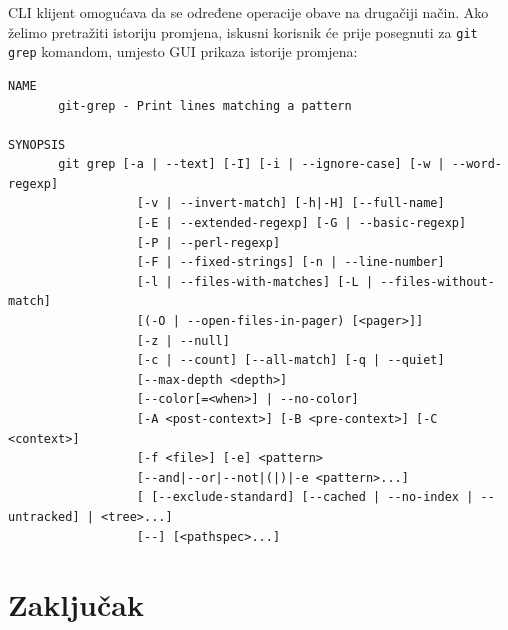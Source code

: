 \documentclass[times, utf8, seminar]{fit}
\begin{document}
CLI klijent omogućava da se određene operacije obave na drugačiji način. Ako želimo pretražiti istoriju promjena, iskusni korisnik će prije posegnuti za \verb+git grep+ komandom, umjesto GUI prikaza istorije promjena:

\begin{lstlisting}  
NAME
       git-grep - Print lines matching a pattern

SYNOPSIS
       git grep [-a | --text] [-I] [-i | --ignore-case] [-w | --word-regexp]
                  [-v | --invert-match] [-h|-H] [--full-name]
                  [-E | --extended-regexp] [-G | --basic-regexp]
                  [-P | --perl-regexp]
                  [-F | --fixed-strings] [-n | --line-number]
                  [-l | --files-with-matches] [-L | --files-without-match]
                  [(-O | --open-files-in-pager) [<pager>]]
                  [-z | --null]
                  [-c | --count] [--all-match] [-q | --quiet]
                  [--max-depth <depth>]
                  [--color[=<when>] | --no-color]
                  [-A <post-context>] [-B <pre-context>] [-C <context>]
                  [-f <file>] [-e] <pattern>
                  [--and|--or|--not|(|)|-e <pattern>...]
                  [ [--exclude-standard] [--cached | --no-index | --untracked] | <tree>...]
                  [--] [<pathspec>...]
\end{lstlisting}


\chapter{Zaključak}




\end{document}
